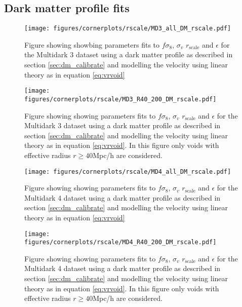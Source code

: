\subsection{Dark matter profile fits}

\begin{figure}[htbp]\label{fig:linbiasMD3DM}
    \texttt{[image: figures/cornerplots/rscale/MD3\_all\_DM\_rscale.pdf]}
    \caption{Figure showing showbing parameters fits to $f\sigma_8$, $\sigma_v$ $r_{\mathrm{scale}}$ and $\epsilon$ for the Multidark 3 dataset using a dark matter profile as described in section \ref{sec:dm_calibrate} and modelling the velocity using linear theory as in equation \ref{eq:vrvoid}}
\end{figure}

\begin{figure}[htbp]\label{fig:linbiasMD3DMR40}
    \texttt{[image: figures/cornerplots/rscale/MD3\_R40\_200\_DM\_rscale.pdf]}
    \caption{Figure showing showing parameters fits to $f\sigma_8$, $\sigma_v$ $r_{\mathrm{scale}}$ and $\epsilon$ for the Multidark 3 dataset using a dark matter profile as described in section \ref{sec:dm_calibrate} and modelling the velocity using linear theory as in equation \ref{eq:vrvoid}. In this figure only voids with effective radius $r \geq 40$Mpc/h are considered.}
\end{figure}

\begin{figure}[htbp]\label{fig:linbiasMD4DM}
    \texttt{[image: figures/cornerplots/rscale/MD4\_all\_DM\_rscale.pdf]}
    \caption{Figure showing showing parameters fits to $f\sigma_8$, $\sigma_v$ $r_{\mathrm{scale}}$ and $\epsilon$ for the Multidark 4 dataset using a dark matter profile as described in section \ref{sec:dm_calibrate} and modelling the velocity using linear theory as in equation \ref{eq:vrvoid}}
\end{figure}

\begin{figure}[htbp]\label{fig:linbiasMD4DMR40}
    \texttt{[image: figures/cornerplots/rscale/MD4\_R40\_200\_DM\_rscale.pdf]}
    \caption{Figure showing showing parameters fits to $f\sigma_8$, $\sigma_v$ $r_{\mathrm{scale}}$ and $\epsilon$ for the Multidark 4 dataset using a dark matter profile as described in section \ref{sec:dm_calibrate} and modelling the velocity using linear theory as in equation \ref{eq:vrvoid}. In this figure only voids with effective radius $r \geq 40$Mpc/h are considered.}
\end{figure}

